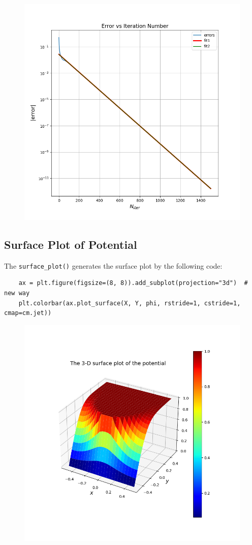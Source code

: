 \documentclass[12pt, a4paper]{article}
\newcommand{\code}{\lstinline[basicstyle=\small]}
\begin{document}
\begin{figure}[H]
    \centering
    \includegraphics[scale=0.4]{7d.png}
\end{figure}


\subsection{Surface Plot of Potential}
The \code{surface_plot()} generates the surface plot by the following code:
\begin{lstlisting}
    ax = plt.figure(figsize=(8, 8)).add_subplot(projection="3d")  # new way
    plt.colorbar(ax.plot_surface(X, Y, phi, rstride=1, cstride=1, cmap=cm.jet))
\end{lstlisting}
\begin{figure}[H]
    \centering
    \includegraphics[scale=0.425]{8.png}
\end{figure}
\end{document}
